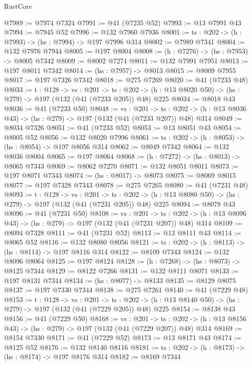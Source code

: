 \begin{lexlean}{RustCore}
\begin{coremodule}
@7989 := @7974 @7324
@7991 := @41 (@7235 @52)
@7993 := @13 @7991 @43
@7994 := @7945 @52
@7996 := @132 @7960 @7936
@8001 := {ts : @202} -> (h : @7993) -> (hs : @7994) -> @197 @7996 @314
@8002 := @7989 @7341
@8004 := @132 @7976 @7944
@8005 := @197 @8004
@8008 := (h : @7276) -> (hs : @7953) -> @8005 @7342
@8009 := @8002 @7274
@8011 := @132 @7991 @7951
@8013 := @197 @8011 @7342
@8014 := (hs : @7957) -> @8013
@8015 := @8009 @7955
@8017 := @197 @7326 @7342
@8018 := @275 @7269
@8020 := @41 (@7233 @48)
@8033 := {t : @128} ->
  {vs : @201} ->
  {ts : @202} -> (h : @13 @8020 @50) -> (hs : @279) -> @197 (@132 (@41 (@7233 @205)) @48) @225
@8034 := @8018 @43
@8036 := @41 (@7233 @50)
@8048 := {vs : @201} ->
  {ts : @202} -> (h : @13 @8036 @43) -> (hs : @279) -> @197 (@132 (@41 (@7233 @207)) @48) @314
@8049 := @8034 @7326
@8051 := @41 (@7233 @52)
@8053 := @13 @8051 @43
@8054 := @8005 @52
@8056 := @132 @8020 @7996
@8061 := {ts : @202} -> (h : @8053) -> (hs : @8054) -> @197 @8056 @314
@8062 := @8049 @7342
@8064 := @132 @8036 @8004
@8065 := @197 @8064
@8068 := (h : @7272) -> (hs : @8013) -> @8065 @7343
@8069 := @8062 @7270
@8071 := @132 @8051 @8011
@8073 := @197 @8071 @7343
@8074 := (hs : @8017) -> @8073
@8075 := @8069 @8015
@8077 := @197 @7328 @7343
@8078 := @275 @7265
@8080 := @41 (@7231 @48)
@8093 := {t : @128} ->
  {vs : @201} ->
  {ts : @202} -> (h : @13 @8080 @50) -> (hs : @279) -> @197 (@132 (@41 (@7231 @205)) @48) @225
@8094 := @8078 @43
@8096 := @41 (@7231 @50)
@8108 := {vs : @201} ->
  {ts : @202} -> (h : @13 @8096 @43) -> (hs : @279) -> @197 (@132 (@41 (@7231 @207)) @48) @314
@8109 := @8094 @7328
@8111 := @41 (@7231 @52)
@8113 := @13 @8111 @43
@8114 := @8065 @52
@8116 := @132 @8080 @8056
@8121 := {ts : @202} -> (h : @8113) -> (hs : @8114) -> @197 @8116 @314
@8122 := @8109 @7343
@8124 := @132 @8096 @8064
@8125 := @197 @8124
@8128 := (h : @7268) -> (hs : @8073) -> @8125 @7344
@8129 := @8122 @7266
@8131 := @132 @8111 @8071
@8133 := @197 @8131 @7344
@8134 := (hs : @8077) -> @8133
@8135 := @8129 @8075
@8137 := @197 @7330 @7344
@8138 := @275 @7261
@8140 := @41 (@7229 @48)
@8153 := {t : @128} ->
  {vs : @201} ->
  {ts : @202} -> (h : @13 @8140 @50) -> (hs : @279) -> @197 (@132 (@41 (@7229 @205)) @48) @225
@8154 := @8138 @43
@8156 := @41 (@7229 @50)
@8168 := {vs : @201} ->
  {ts : @202} -> (h : @13 @8156 @43) -> (hs : @279) -> @197 (@132 (@41 (@7229 @207)) @48) @314
@8169 := @8154 @7330
@8171 := @41 (@7229 @52)
@8173 := @13 @8171 @43
@8174 := @8125 @52
@8176 := @132 @8140 @8116
@8181 := {ts : @202} -> (h : @8173) -> (hs : @8174) -> @197 @8176 @314
@8182 := @8169 @7344

\end{coremodule}
\end{lexlean}
